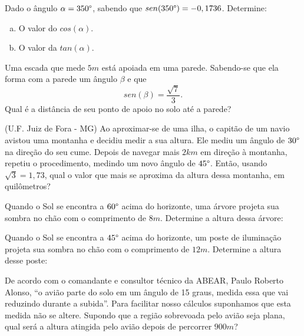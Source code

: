  \begin{exer}
 Dado o ângulo $\alpha= 350\degree$, sabendo que $sen(350\degree)= -0,1736$. Determine:
 \begin{enumerate}[a)]
 \item O valor do $cos(\alpha)$.
 \item O valor da $tan(\alpha)$.
 \end{enumerate}
 \end{exer}
 
 \begin{exer}
 Uma escada que mede $5m$ está apoiada em uma parede. Sabendo-se que ela forma com a parede um ângulo $\beta$ e que
\begin{equation}
sen(\beta)=\frac{\sqrt{7}}{3}.
\end{equation}
Qual é a distância de seu ponto de apoio no solo até a parede?
 \end{exer}
 
 \begin{exer}
 (U.F. Juiz de Fora - MG) Ao aproximar-se de uma ilha, o capitão de um navio avistou uma montanha e decidiu medir a sua altura. Ele mediu um ângulo de $30\degree$ na direção do seu cume. Depois de navegar mais $2 km$ em direção à montanha, repetiu o procedimento, medindo um novo ângulo de $45\degree$. Então, usando $\sqrt{3} = 1,73$, qual o valor que mais se aproxima da altura dessa montanha, em quilômetros? 
 \end{exer}
 
 \begin{exer}
 Quando o Sol se encontra a $60\degree$ acima do horizonte, uma árvore projeta sua sombra no chão com o comprimento de $8 m$. Determine a altura dessa árvore:
 \end{exer}
 
 \begin{exer}
 Quando o Sol se encontra a $45\degree$ acima do horizonte, um poste de iluminação projeta sua sombra no chão com o comprimento de $12 m$. Determine a altura desse poste:
 \end{exer}
 
 \begin{exer}
 De acordo com o comandante e consultor técnico da ABEAR, Paulo Roberto Alonso, “o avião parte do solo em um ângulo de 15 graus, medida essa que vai reduzindo durante a subida”. Para facilitar nosso cálculos suponhamos que esta medida não se altere. Supondo que a região sobrevoada pelo avião seja plana, qual será a altura atingida pelo avião depois de percorrer $900 m$?
 \end{exer}
 
